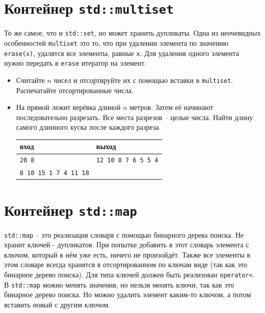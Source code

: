 \documentclass{article}
\begin{document}
\section*{Контейнер \texttt{std::multiset}}
То же самое, что и \texttt{std::set}, но может хранить дупликаты. Одна из неочевидных особенностей \texttt{multiset} это то, что при удалении элемента по значению \texttt{erase(x)}, удалятся все элементы, равные \texttt{x}. Для удаления одного элемента нужно передать в \texttt{erase} итератор на элемент.
\begin{itemize}
\item Считайте $n$ чисел и отсортируйте их с помощью вставки в \texttt{multiset}. Распечатайте отсортированные числа.
\item На прямой лежит верёвка длиной $n$ метров. Затем её начинают последовательно разрезать. Все места разрезов -- целые числа. Найти длину самого длинного куска после каждого разреза.
\begin{center}
\begin{tabular}{ l | l }
 вход & выход \\ \hline
 \texttt{20 8} & \texttt{12 10 8 7 6 5 5 4}  \\ 
 \texttt{8 10 15 1 7 4 11 18} &  \\
\end{tabular}
\end{center}
\end{itemize}

\newpage
\section*{Контейнер \texttt{std::map}}
\texttt{std::map} -- это реализация словаря с помощью бинарного дерева поиска. Не хранит ключей - дупликатов. При попытке добавить в этот словарь элемента с ключом, который в нём уже есть, ничего не произойдёт. Также все элементы в этом словаре всегда хранятся в отсортированном по ключам виде (так как это бинарное дерево поиска). Для типа ключей должен быть реализован \texttt{operator<}. В \texttt{std::map} можно менять значения, но нельзя менять ключи, так как это бинарное дерево поиска. Но можно удалить элемент каким-то ключом, а потом вставить новый с другим ключом.\\
\end{document}
